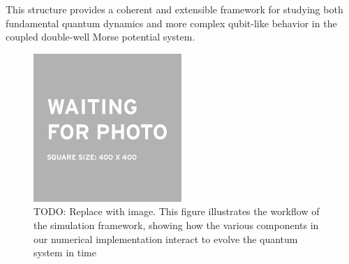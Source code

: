 \documentclass{subfiles}
\begin{document}
This structure provides a coherent and extensible framework for studying both fundamental quantum dynamics and more complex qubit-like behavior in the coupled double-well Morse potential system.

\begin{figure}[h!]
    \centering
    \includegraphics[width=0.5\textwidth]{figs/placeholder_image.jpeg}
    \caption{TODO: Replace with image. This figure illustrates the workflow of the simulation framework, showing how the various components in our numerical implementation interact to evolve the quantum system in time}
\end{figure}
\end{document}
